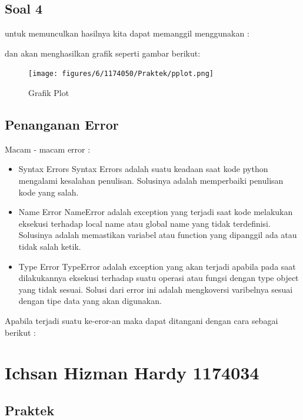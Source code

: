 \subsection{Soal 4}

untuk memunculkan hasilnya kita dapat memanggil menggunakan :


dan akan menghasilkan grafik seperti gambar berikut:
\begin{figure}[H]
\centering
\texttt{[image: figures/6/1174050/Praktek/pplot.png]}
\caption{Grafik Plot}
\end{figure}


\subsection{Penanganan Error}
Macam - macam error :
\begin{itemize}
	\item Syntax Errors
	Syntax Errors adalah suatu keadaan saat kode python mengalami kesalahan penulisan. Solusinya adalah memperbaiki penulisan kode yang salah.
	
	\item Name Error
	NameError adalah exception yang terjadi saat kode melakukan eksekusi terhadap local name atau global name yang tidak terdefinisi. Solusinya adalah memastikan variabel atau function yang dipanggil ada atau tidak salah ketik.
	
	\item Type Error
	TypeError adalah exception yang akan terjadi apabila pada saat dilakukannya eksekusi terhadap suatu operasi atau fungsi dengan type object yang tidak sesuai. Solusi dari error ini adalah mengkoversi varibelnya sesuai dengan tipe data yang akan digunakan.
\end{itemize}
Apabila terjadi suatu ke-eror-an maka dapat ditangani dengan cara sebagai berikut :



\section{Ichsan Hizman Hardy 1174034}
\subsection{Praktek}
